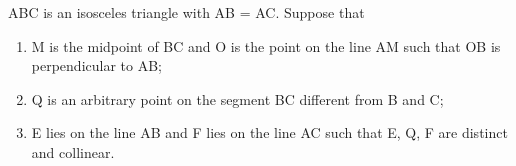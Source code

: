 \item ABC is an isosceles triangle with AB = AC. Suppose that
\begin{enumerate}
\item M is the midpoint of BC and O is the point on the line AM such that OB is perpendicular to AB;
\item Q is an arbitrary point on the segment BC different from B and C;
\item E lies on the line AB and F lies on the line AC such that E, Q, F are distinct and collinear.
\end{enumerate}



